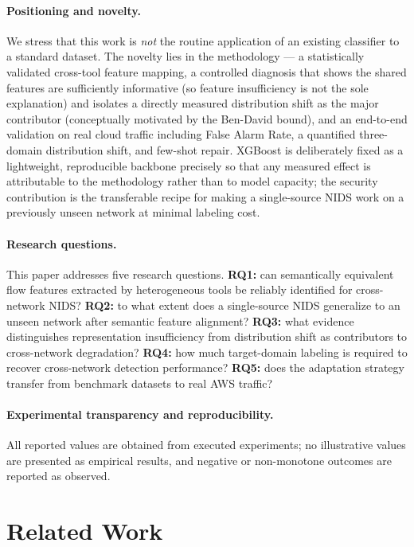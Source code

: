 \documentclass[preprint,12pt,authoryear]{elsarticle}
\begin{document}
\paragraph{Positioning and novelty.} We stress that this work is \emph{not} the
routine application of an existing classifier to a standard dataset. The novelty
lies in the methodology --- a statistically validated cross-tool feature mapping,
a controlled diagnosis that shows the shared features are sufficiently informative
(so feature insufficiency is not the sole explanation) and isolates a directly
measured distribution shift as the major contributor (conceptually
motivated by the Ben-David bound), and an end-to-end validation on real cloud
traffic including False Alarm Rate, a quantified three-domain distribution shift,
and few-shot repair. XGBoost is deliberately fixed as a lightweight, reproducible
backbone precisely so that any measured effect is attributable to the methodology
rather than to model capacity; the security contribution is the transferable
recipe for making a single-source NIDS work on a previously unseen network at
minimal labeling cost.

\paragraph{Research questions.} This paper addresses five research questions.
\textbf{RQ1:} can semantically equivalent flow features extracted by heterogeneous
tools be reliably identified for cross-network NIDS? \textbf{RQ2:} to what extent
does a single-source NIDS generalize to an unseen network after semantic feature
alignment? \textbf{RQ3:} what evidence distinguishes representation insufficiency
from distribution shift as contributors to cross-network degradation? \textbf{RQ4:}
how much target-domain labeling is required to recover cross-network detection
performance? \textbf{RQ5:} does the adaptation strategy transfer from benchmark
datasets to real AWS traffic?

\paragraph{Experimental transparency and reproducibility.} All reported values are
obtained from executed experiments; no illustrative values are presented as
empirical results, and negative or non-monotone outcomes are reported as observed.

\section{Related Work}
\label{sec:related}
\end{document}
